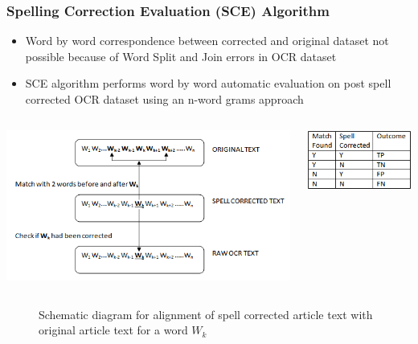 \documentclass{beamer}
\begin{document}
\begin{frame}
\frametitle{Spelling Correction Evaluation (SCE) Algorithm}
\begin{itemize}
\item Word by word correspondence between corrected and original dataset not possible because of Word Split and Join errors in OCR dataset
\item SCE algorithm performs word by word automatic evaluation on post spell corrected OCR dataset using an n-word grams approach
\end{itemize}

\begin{columns}
\centering
\includegraphics[scale=0.5]{images/ngram}

\centering
\includegraphics[scale=0.5]{images/ngram2}

\end{columns}
\begin{figure}
\caption{Schematic diagram for alignment of spell corrected article text with original article text for a word $W_{k}$}
\end{figure}
\end{frame}
\end{document}
